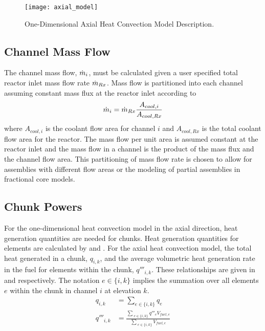     \begin{figure}
      \centering
      \texttt{[image: axial\_model]}
      \caption{One-Dimensional Axial Heat Convection Model Description.}
      \label{fig:axial_model}
    \end{figure}

  \subsection{Channel Mass Flow}
    The channel mass flow, $\dot{m}_i$, must be calculated given a user 
    specified total reactor inlet mass flow rate $\dot{m}_{Rx}$.  Mass flow is 
    partitioned into each channel assuming constant mass flux at the reactor 
    inlet according to 
    \begin{equation}
      \label{eq:mass_flow_split}
      \dot{m}_i = \dot{m}_{Rx} \frac{A_{cool,i}}{A_{cool,Rx}}
    \end{equation}
    where $A_{cool,i}$ is the coolant flow area for channel $i$ and 
    $A_{cool,Rx}$ is the total coolant flow area for the reactor. The mass flow 
    per unit area is assumed constant at the reactor inlet and the mass flow in
    a channel is the product of the mass flux and the channel flow area. This 
    partitioning of mass flow rate is chosen to allow for assemblies with 
    different flow areas or the modeling of partial assemblies in fractional 
    core models.

  \subsection{Chunk Powers}
    For the one-dimensional heat convection model in the axial direction,
    heat generation quantities are needed for chunks. Heat generation quantities
    for elements are calculated by  and
    .
    For the axial heat convection model, the total heat generated in a chunk,
    $q_{i,k}$, and the average volumetric heat generation rate in the fuel for
    elements within the chunk, $q'''_{i,k}$. 
    These relationships are given in  and
     respectively. The notation $e \in \{i,k\}$ implies 
    the summation over all elements $e$ within the chunk in channel $i$ at
    elevation $k$.
    \begin{align}
      \label{eq:chunkpwr}
      q_{i,k} &= \sum_{e \in \{i,k\}} q_e \\
      \label{eq:chunkqppp_fuel}
      q'''_{i,k} &= \frac{\sum_{\; e \in \{i,k\}} q'''_e V_{fuel,e}}
        {\sum_{\; e \in \{i,k\}} V_{fuel,e}}
    \end{align}
  
